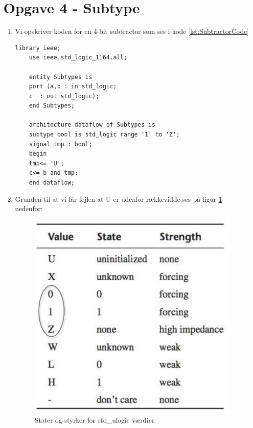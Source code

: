 \section{Opgave 4 - Subtype}
\begin{enumerate}
	\item[1)]
	Vi opskriver koden for en 4-bit subtractor som ses i kode \ref{lst:SubtractorCode}
	\begin{lstlisting}[caption={Subtractor kode},label={lst:SubtractorCode}]
	library ieee;
	use ieee.std_logic_1164.all;
	
	entity Subtypes is
	port (a,b : in std_logic;
	c  : out std_logic);
	end Subtypes;
	
	architecture dataflow of Subtypes is
	subtype bool is std_logic range '1' to 'Z';
	signal tmp : bool;
	begin 
	tmp<= 'U';
	c<= b and tmp;
	end dataflow;
		\end{lstlisting}
	\item[2)]
	
	Grunden til at vi får fejlen at U er udenfor rækkevidde ses på figur \ref{fig:stdulogicvalues} nedenfor:
	
		\begin{figure}[H]
			\centering
			\includegraphics[scale=0.23]{pictures/Oevelse3/Oevelse4_01Z.jpg}
			\caption{Stater og styrker for std\_ulogic værdier}
			\label{fig:stdulogicvalues}
		\end{figure}
	

\end{enumerate}
